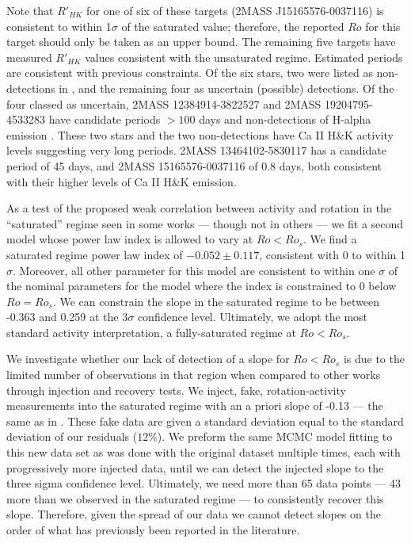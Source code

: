 Note that $R'_{HK}$ for one of six of these targets (2MASS
J15165576-0037116) is consistent to within 1$\sigma$ of the saturated value;
therefore, the reported $Ro$ for this target should only be taken as an upper
bound. The remaining five targets have measured $R'_{HK}$ values consistent
with the unsaturated regime. Estimated periods are consistent with previous
constraints. Of the six stars, two were listed as non-detections in
\citet{Newton2018}, and the remaining four as uncertain (possible) detections.
Of the four classed as uncertain, 2MASS 12384914-3822527 and 2MASS
19204795-4533283 have candidate periods $>100$ days and non-detections of
H-alpha emission \citep{Hawley96}. These two stars and the two non-detections
have Ca II H\&K activity levels suggesting very long periods. 2MASS
13464102-5830117 has a candidate period of 45 days, and 2MASS 15165576-0037116
of 0.8 days, both consistent with their higher levels of Ca II H\&K emission.

As a test of the proposed weak correlation between activity and rotation in the
``saturated'' regime seen in some works \citep{Mamajek2008,
Reiners2014, Leh20, Med20} --- though not in others \citep{Wri11, Nunez2015,
Newton2017} ---   we fit a second model whose power law index is allowed to
vary at $Ro < Ro_{s}$. We find a saturated regime power law index of
$-0.052\pm0.117$, consistent with 0 to within 1$\sigma$. Moreover,
all other parameter for this model are consistent to within one $\sigma$ of the
nominal  parameters for the model where the index is constrained to 0 below
$Ro=Ro_{s}$. We can constrain the slope in the saturated
regime to be between -0.363 and 0.259 at the $3\sigma$ confidence level.
Ultimately, we adopt the most standard activity interpretation, a
fully-saturated regime at $Ro < Ro_{s}$. 

We investigate whether our lack of detection of a slope for $Ro <
Ro_{s}$ is due to the limited number of observations in that region when
compared to other works \citep[e.g.][93 targets $Ro < Ro_{s}$]{Med20} through
injection and recovery tests. We inject, fake, rotation-activity measurements
into the saturated regime with an a priori slope of -0.13 --- the same as in
\citeauthor{Med20}. These fake data are given a standard deviation equal to the
standard deviation of our residuals ($12\%$). We preform the same MCMC model
fitting to this new data set as was done with the original dataset multiple
times, each with progressively more injected data, until we can detect the
injected slope to the three sigma confidence level. Ultimately, we need more
than 65 data points --- 43 more than we observed in the saturated regime --- to
consistently recover this slope. Therefore, given the spread of our data we
cannot detect slopes on the order of what has previously been reported in the
literature.

